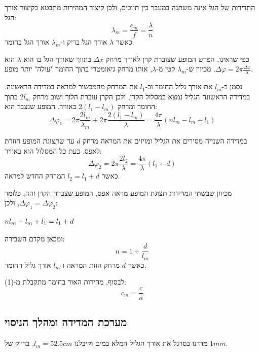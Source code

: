 \documentclass[14pt]{extarticle}
\makeatletter
\newenvironment{lefteqs}{%
    \begin{english}%
    \begin{flushleft}%
    \renewcommand{\arraystretch}{1.3}%
    $\begin{array}{@{}l@{}}%
}{%
    \end{array}$%
    \end{flushleft}%
    \end{english}%
}
\makeatother
\begin{document}
התדירות של הגל אינה משתנה במעבר בין תווכים, ולכן קיצור המהירות מתבטא בקיצור אורך הגל:
\begin{equation}
    \lambda_m = \frac{c_m}{f} = \frac{\lambda}{n}
\end{equation}
כאשר $\lambda$ אורך הגל בריק ו-$\lambda_m$ אורך הגל בחומר.

כפי שראינו, הפרש המופע שצוברת קרן לאורך מרחק $\Delta x$ בתווך שאורך הגל בו הוא $\lambda$ הוא
$\Delta \varphi = 2\pi \frac{\Delta x}{\lambda}$. מכיוון ש-$\lambda_m$ קטן מ-$\lambda$, אותו מרחק גיאומטרי
בתוך החומר "עולה" יותר מופע.

נסמן ב-$l_m$ את אורך גליל החומר וב-$l_1$ את המרחק מהמכשיר למראה במדידה הראשונה.
במדידה הראשונה הגליל נמצא במסלול הקרן, ולכן הקרן עוברת הלוך ושוב מרחק $2l_m$ בתוך החומר
ומרחק $2(l_1 - l_m)$ באוויר. המופע שנצבר הוא:
\begin{equation}
    \Delta \varphi_1 = 2\pi \frac{2 l_m}{\lambda_m} + 2\pi \frac{2(l_1 - l_m)}{\lambda}
    = \frac{4\pi}{\lambda}\left( n l_m - l_m + l_1 \right)
\end{equation}

במדידה השנייה מסירים את הגליל ומזיזים את המראה מרחק $d$ עד שתצוגת המופע חוזרת לאפס.
כעת כל המסלול הוא באוויר:
\begin{equation}
    \Delta \varphi_2 = 2\pi \frac{2 l_2}{\lambda} = \frac{4\pi}{\lambda}\left( l_1 + d \right)
\end{equation}
כאשר $l_2 = l_1 + d$ המרחק החדש למראה.

מכיוון שבשתי המדידות תצוגת המופע מראה אפס, המופע שצברה הקרן זהה, כלומר $\Delta \varphi_1 = \Delta \varphi_2$, ולכן:
\begin{lefteqs}
    n l_m - l_m + l_1 = l_1 + d
\end{lefteqs}
ומכאן מקדם השבירה:
\begin{equation}
    n = 1 + \frac{d}{l_m}
\end{equation}
כאשר $d$ מרחק הזזת המראה ו-$l_m$ אורך גליל החומר.

לבסוף, מהירות האור בחומר מתקבלת מ-(1):
\begin{equation}
    c_m = \frac{c}{n}
\end{equation}

\subsection*{מערכת המדידה ומהלך הניסוי}

מדדנו בסרגל את אורך הגליל המלא במים וקיבלנו $l_m = 52.5cm$, בדיוק של $1mm$.
\end{document}
